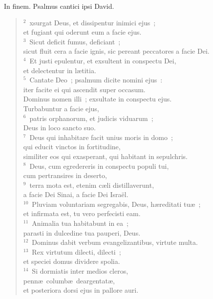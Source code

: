 \bchapter[Psalm]
In finem. Psalmus cantici ipsi David.
\begin{verse}${}^{2}$~xsurgat Deus, et dissipentur inimici ejus~;\\ et fugiant qui oderunt eum a facie ejus.\\
${}^{3}$~Sicut deficit fumus, deficiant~;\\ sicut fluit cera a facie ignis, sic pereant peccatores a facie Dei.\\
${}^{4}$~Et justi epulentur, et exsultent in conspectu Dei,\\ et delectentur in l\ae titia.\\
${}^{5}$~Cantate Deo~; psalmum dicite nomini ejus~:\\ iter facite ei qui ascendit super occasum.\\ Dominus nomen illi~; exsultate in conspectu ejus.\\ Turbabuntur a facie ejus,\\
${}^{6}$~patris orphanorum, et judicis viduarum~;\\ Deus in loco sancto suo.\\
${}^{7}$~Deus qui inhabitare facit unius moris in domo~;\\ qui educit vinctos in fortitudine,\\ similiter eos qui exasperant, qui habitant in sepulchris.\\
${}^{8}$~Deus, cum egredereris in conspectu populi tui,\\ cum pertransires in deserto,\\
${}^{9}$~terra mota est, etenim c\ae li distillaverunt,\\ a facie Dei Sinai, a facie Dei Isra\"el.\\
${}^{10}$~Pluviam voluntariam segregabis, Deus, h\ae reditati tu\ae~;\\ et infirmata est, tu vero perfecisti eam.\\
${}^{11}$~Animalia tua habitabunt in ea~;\\ parasti in dulcedine tua pauperi, Deus.\\
${}^{12}$~Dominus dabit verbum evangelizantibus, virtute multa.\\
${}^{13}$~Rex virtutum dilecti, dilecti~;\\ et speciei domus dividere spolia.\\
${}^{14}$~Si dormiatis inter medios cleros,\\ penn\ae\ columb\ae\ deargentat\ae ,\\ et posteriora dorsi ejus in pallore auri.\\

\end{verse}
